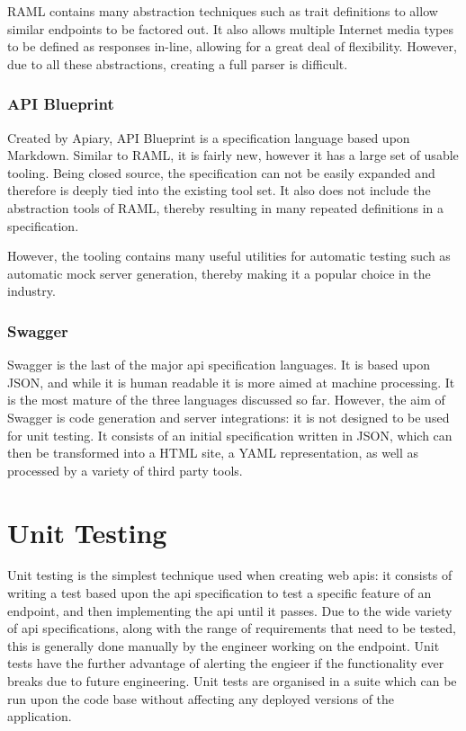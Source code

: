 RAML contains many abstraction techniques such as trait definitions to allow similar endpoints to be factored out. It also allows multiple Internet media types to be defined as responses in-line, allowing for a great deal of flexibility. However, due to all these abstractions, creating a full parser is difficult.

\subsubsection{API Blueprint}

Created by Apiary, API Blueprint\cite{blueprintsite} is a specification language based upon Markdown. Similar to RAML, it is fairly new, however it has a large set of usable tooling. Being closed source, the specification can not be easily expanded and therefore is deeply tied into the existing tool set. It also does not include the abstraction tools of RAML, thereby resulting in many repeated definitions in a specification.

However, the tooling contains many useful utilities for automatic testing such as automatic mock server generation, thereby making it a popular choice in the industry.

\subsubsection{Swagger}

Swagger\cite{swaggersite} is the last of the major api specification languages. It is based upon JSON, and while it is human readable it is more aimed at machine processing. It is the most mature of the three languages discussed so far. However, the aim of Swagger is code generation and server integrations: it is not designed to be used for unit testing. It consists of an initial specification written in JSON, which can then be transformed into a HTML site, a YAML representation, as well as processed by a variety of third party tools.



\section{Unit Testing}

Unit testing is the simplest technique used when creating web apis: it consists of writing a test based upon the api specification to test a specific feature of an endpoint, and then implementing the api until it passes. Due to the wide variety of api specifications, along with the range of requirements that need to be tested, this is generally done manually by the engineer working on the endpoint. Unit tests have the further advantage of alerting the engieer if the functionality ever breaks due to future engineering. Unit tests are organised in a suite which can be run upon the code base without affecting any deployed versions of the application.


